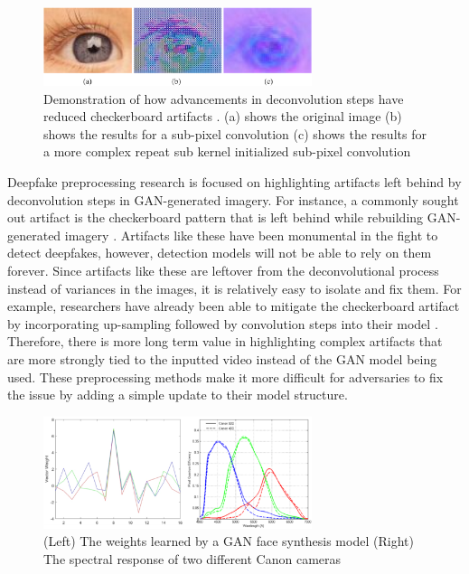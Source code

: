 \documentclass[a4paper]{article}
\begin{document}
\begin{figure}[ht]
\centering
\includegraphics[width=0.7\textwidth]{images/pixelated_eyes.png}
\caption{Demonstration of how advancements in deconvolution steps have reduced checkerboard artifacts \cite{deconv_img}. (a) shows the original image (b) shows the results for a sub-pixel convolution (c) shows the results for a more complex repeat sub kernel initialized sub-pixel convolution}
\label{fig:Checkerboard_Eyes}
\end{figure}

Deepfake preprocessing research is focused on highlighting artifacts left behind by deconvolution steps in GAN-generated imagery. For instance, a commonly sought out artifact is the checkerboard pattern that is left behind while rebuilding GAN-generated imagery \cite{deconv_img}\cite{Color_Cues}\cite{Checker_Board}. Artifacts like these have been monumental in the fight to detect deepfakes, however, detection models will not be able to rely on them forever. Since artifacts like these are leftover from the deconvolutional process instead of variances in the images, it is relatively easy to isolate and fix them. For example, researchers have already been able to mitigate the checkerboard artifact by incorporating up-sampling followed by convolution steps into their model \cite{Checker_Board}. Therefore, there is more long term value in highlighting complex artifacts that are more strongly tied to the inputted video instead of the GAN model being used. These preprocessing methods make it more difficult for adversaries to fix the issue by adding a simple update to their model structure.

\begin{figure}[ht]
\centering
\includegraphics[width=0.7\textwidth]{images/spectral_response.png}
\caption{(Left) The weights learned by a GAN face synthesis model \cite{GAN_weights} (Right) The spectral response of two different Canon cameras \cite{Canon}}
\label{fig:Spectral_Responce}
\end{figure}
\end{document}
